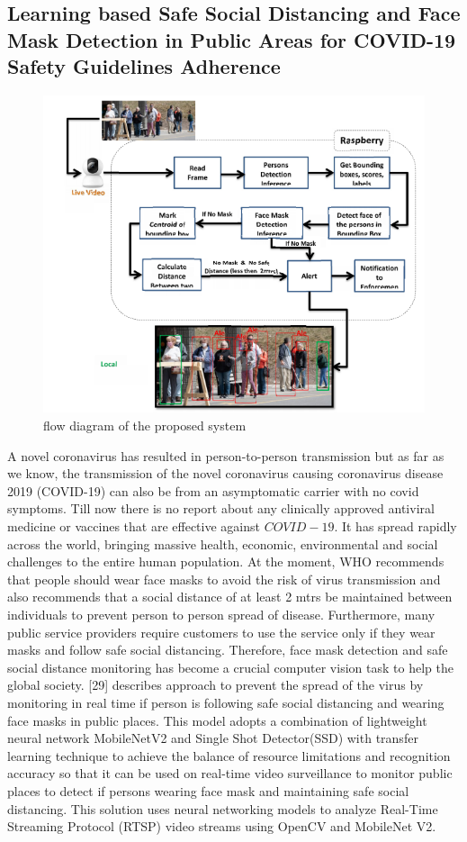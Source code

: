 \documentclass[12pt,a4paper]{article}
\begin{document}
\subsection{Learning based Safe Social Distancing and Face Mask Detection in Public Areas for COVID-19 Safety Guidelines Adherence}
\begin{figure}[h]
\centerline{\includegraphics[scale=.8]{PUBLIC.png}}
\caption{flow diagram of the proposed system}
\label{fig 11}
\end{figure}
A novel coronavirus has resulted in person-to-person transmission but as far as we know, the transmission of the novel coronavirus causing coronavirus disease 2019 (COVID-19) can also be from an asymptomatic carrier with no covid symptoms. Till now there is no report about any clinically approved antiviral medicine or vaccines that are effective against 
$COVID-19$. It has spread rapidly across the world, bringing massive health, economic, environmental and social challenges to the entire human population. At the moment, WHO recommends that people should wear face masks to avoid the risk of virus transmission and also recommends that a social distance of at least 2 mtrs  be maintained between individuals to prevent person to person spread of disease. Furthermore, many public service providers require customers to use the service only if they wear masks and follow safe social distancing. Therefore, face mask detection and safe social distance monitoring has become a crucial computer vision task to help the global society. [29] describes approach to prevent the spread of the virus by monitoring in real time if person is following safe social distancing and wearing face masks in public places. This model adopts a combination of lightweight neural network MobileNetV2 and Single Shot Detector(SSD) with transfer learning technique to achieve the balance of resource limitations and recognition accuracy so that it can be used on real-time video surveillance to monitor public places to detect if persons wearing face mask and maintaining safe social distancing. This solution uses neural networking models to analyze Real-Time Streaming Protocol (RTSP) video streams using OpenCV and MobileNet V2. 
\end{document}
